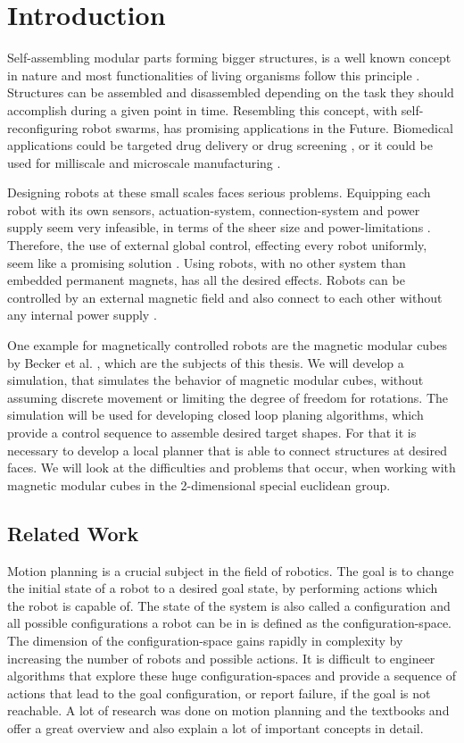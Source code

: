 \chapter{Introduction}

Self-assembling modular parts forming bigger structures, is a well known concept in nature and most functionalities of living organisms follow this principle \cite{bishop2005}.
Structures can be assembled and disassembled depending on the task they should accomplish during a given point in time. 
Resembling this concept, with self-reconfiguring robot swarms, has promising applications in the Future.
Biomedical applications could be targeted drug delivery or drug screening \cite{sitti2015}, or it could be used for milliscale and microscale manufacturing \cite{pelrine2016}.

Designing robots at these small scales faces serious problems.
Equipping each robot with its own sensors, actuation-system, connection-system and power supply seem very infeasible, in terms of the sheer size and power-limitations \cite{white2007}.
Therefore, the use of external global control, effecting every robot uniformly, seem like a promising solution \cite{white2007}.
Using robots, with no other system than embedded permanent magnets, has all the desired effects.
Robots can be controlled by an external magnetic field and also connect to each other without any internal power supply \cite{saab2019}.

One example for magnetically controlled robots are the magnetic modular cubes by Becker et al. \cite{Becker2022}, which are the subjects of this thesis.
We will develop a simulation, that simulates the behavior of magnetic modular cubes, without assuming discrete movement or limiting the degree of freedom for rotations.
The simulation will be used for developing closed loop planing algorithms, which provide a control sequence to assemble desired target shapes.
For that it is necessary to develop a local planner that is able to connect structures at desired faces.
We will look at the difficulties and problems that occur, when working with magnetic modular cubes in the 2-dimensional special euclidean group.


\section{Related Work}

Motion planning is a crucial subject in the field of robotics.
The goal is to change the initial state of a robot to a desired goal state, by performing actions which the robot is capable of.
The state of the system is also called a configuration and all possible configurations a robot can be in is defined as the configuration-space.
The dimension of the configuration-space gains rapidly in complexity by increasing the number of robots and possible actions.
It is difficult to engineer algorithms that explore these huge configuration-spaces and provide a sequence of actions that lead to the goal configuration, or report failure, if the goal is not reachable.
A lot of research was done on motion planning and the textbooks \cite{LaValle2006} and \cite{Mueller2019} offer a great overview and also explain a lot of important concepts in detail.

